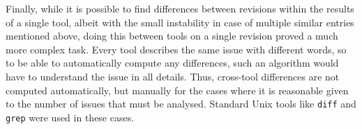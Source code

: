 Finally, while it is possible to find differences between revisions within the
results of a single tool, albeit with the small instability in case of multiple
similar entries mentioned above, doing this between tools on a single revision
proved a much more complex task. Every tool describes the same issue with
different words, so to be able to automatically compute any differences, such
an algorithm would have to understand the issue in all details. Thus,
cross-tool differences are not computed automatically, but manually for the
cases where it is reasonable given to the number of issues that must be
analysed. Standard Unix tools like {\tt diff} and {\tt grep} were used in these
cases.
